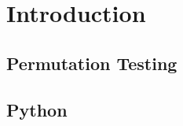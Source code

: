 \chapter{Introduction}

\section{Permutation Testing}

\section{Python}

\cite{millman2011python, Perez2011}

